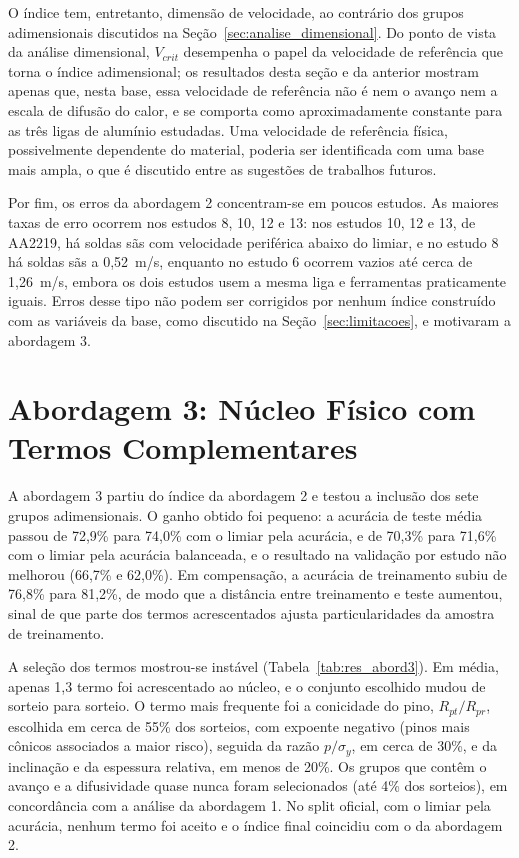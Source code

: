 \documentclass[12pt,openany]{report}
\begin{document}
O índice tem, entretanto, dimensão de velocidade, ao contrário dos grupos adimensionais discutidos na Seção~\ref{sec:analise_dimensional}. Do ponto de vista da análise dimensional, $V_{crit}$ desempenha o papel da velocidade de referência que torna o índice adimensional; os resultados desta seção e da anterior mostram apenas que, nesta base, essa velocidade de referência não é nem o avanço nem a escala de difusão do calor, e se comporta como aproximadamente constante para as três ligas de alumínio estudadas. Uma velocidade de referência física, possivelmente dependente do material, poderia ser identificada com uma base mais ampla, o que é discutido entre as sugestões de trabalhos futuros.

Por fim, os erros da abordagem 2 concentram-se em poucos estudos. As maiores taxas de erro ocorrem nos estudos 8, 10, 12 e 13: nos estudos 10, 12 e 13, de AA2219, há soldas sãs com velocidade periférica abaixo do limiar, e no estudo 8 há soldas sãs a 0,52~m/s, enquanto no estudo 6 ocorrem vazios até cerca de 1,26~m/s, embora os dois estudos usem a mesma liga e ferramentas praticamente iguais. Erros desse tipo não podem ser corrigidos por nenhum índice construído com as variáveis da base, como discutido na Seção~\ref{sec:limitacoes}, e motivaram a abordagem 3.

\section{Abordagem 3: Núcleo Físico com Termos Complementares}
\label{sec:res_abordagem3}

A abordagem 3 partiu do índice da abordagem 2 e testou a inclusão dos sete grupos adimensionais. O ganho obtido foi pequeno: a acurácia de teste média passou de 72,9\% para 74,0\% com o limiar pela acurácia, e de 70,3\% para 71,6\% com o limiar pela acurácia balanceada, e o resultado na validação por estudo não melhorou (66,7\% e 62,0\%). Em compensação, a acurácia de treinamento subiu de 76,8\% para 81,2\%, de modo que a distância entre treinamento e teste aumentou, sinal de que parte dos termos acrescentados ajusta particularidades da amostra de treinamento.

A seleção dos termos mostrou-se instável (Tabela~\ref{tab:res_abord3}). Em média, apenas 1,3 termo foi acrescentado ao núcleo, e o conjunto escolhido mudou de sorteio para sorteio. O termo mais frequente foi a conicidade do pino, $R_{pt}/R_{pr}$, escolhida em cerca de 55\% dos sorteios, com expoente negativo (pinos mais cônicos associados a maior risco), seguida da razão $p/\sigma_y$, em cerca de 30\%, e da inclinação e da espessura relativa, em menos de 20\%. Os grupos que contêm o avanço e a difusividade quase nunca foram selecionados (até 4\% dos sorteios), em concordância com a análise da abordagem 1. No split oficial, com o limiar pela acurácia, nenhum termo foi aceito e o índice final coincidiu com o da abordagem 2.
\end{document}
